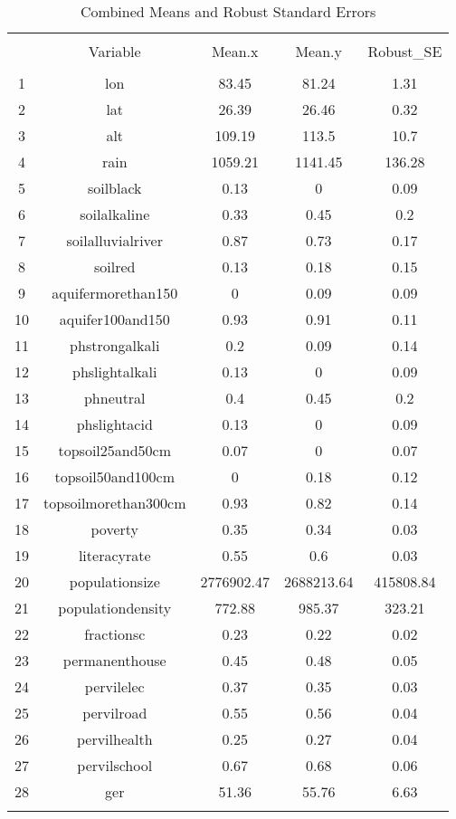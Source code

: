 
\begin{table}[!htbp] \centering 
  \caption{Combined Means and Robust Standard Errors} 
  \label{} 
\begin{tabular}{@{\extracolsep{5pt}} ccccc} 
\\[-1.8ex]\hline 
\hline \\[-1.8ex] 
 & Variable & Mean.x & Mean.y & Robust\_SE \\ 
\hline \\[-1.8ex] 
1 & lon & 83.45 & 81.24 & 1.31 \\ 
2 & lat & 26.39 & 26.46 & 0.32 \\ 
3 & alt & 109.19 & 113.5 & 10.7 \\ 
4 & rain & 1059.21 & 1141.45 & 136.28 \\ 
5 & soilblack & 0.13 & 0 & 0.09 \\ 
6 & soilalkaline & 0.33 & 0.45 & 0.2 \\ 
7 & soilalluvialriver & 0.87 & 0.73 & 0.17 \\ 
8 & soilred & 0.13 & 0.18 & 0.15 \\ 
9 & aquifermorethan150 & 0 & 0.09 & 0.09 \\ 
10 & aquifer100and150 & 0.93 & 0.91 & 0.11 \\ 
11 & phstrongalkali & 0.2 & 0.09 & 0.14 \\ 
12 & phslightalkali & 0.13 & 0 & 0.09 \\ 
13 & phneutral & 0.4 & 0.45 & 0.2 \\ 
14 & phslightacid & 0.13 & 0 & 0.09 \\ 
15 & topsoil25and50cm & 0.07 & 0 & 0.07 \\ 
16 & topsoil50and100cm & 0 & 0.18 & 0.12 \\ 
17 & topsoilmorethan300cm & 0.93 & 0.82 & 0.14 \\ 
18 & poverty & 0.35 & 0.34 & 0.03 \\ 
19 & literacyrate & 0.55 & 0.6 & 0.03 \\ 
20 & populationsize & 2776902.47 & 2688213.64 & 415808.84 \\ 
21 & populationdensity & 772.88 & 985.37 & 323.21 \\ 
22 & fractionsc & 0.23 & 0.22 & 0.02 \\ 
23 & permanenthouse & 0.45 & 0.48 & 0.05 \\ 
24 & pervilelec & 0.37 & 0.35 & 0.03 \\ 
25 & pervilroad & 0.55 & 0.56 & 0.04 \\ 
26 & pervilhealth & 0.25 & 0.27 & 0.04 \\ 
27 & pervilschool & 0.67 & 0.68 & 0.06 \\ 
28 & ger & 51.36 & 55.76 & 6.63 \\ 
\hline \\[-1.8ex] 
\end{tabular} 
\end{table} 
